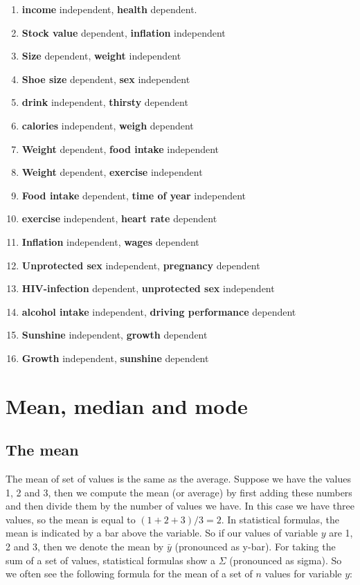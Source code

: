 \begin{enumerate}

\item \textbf{income} independent, \textbf{health} dependent.
\item \textbf{Stock value} dependent, \textbf{inflation} independent
\item \textbf{Size} dependent, \textbf{weight} independent
\item \textbf{Shoe size} dependent, \textbf{sex} independent
\item \textbf{drink} independent, \textbf{thirsty} dependent
\item \textbf{calories} independent, \textbf{weigh} dependent
\item \textbf{Weight} dependent, \textbf{food intake} independent
\item \textbf{Weight} dependent, \textbf{exercise} independent
\item \textbf{Food intake} dependent, \textbf{time of year} independent
\item \textbf{exercise} independent, \textbf{heart rate} dependent
\item \textbf{Inflation} independent, \textbf{wages} dependent
\item \textbf{Unprotected sex} independent, \textbf{pregnancy} dependent
\item \textbf{HIV-infection} dependent, \textbf{unprotected sex} independent
\item \textbf{alcohol intake} independent, \textbf{driving performance} dependent
\item \textbf{Sunshine} independent, \textbf{growth} dependent
\item \textbf{Growth} independent, \textbf{sunshine} dependent

\end{enumerate}





\section{Mean, median and mode}

\subsection{The mean}
The mean of set of values is the same as the average. Suppose we have the values 1, 2 and 3, then we compute the mean (or average) by first adding these numbers and then divide them by the number of values we have. In this case we have three values, so the mean is equal to $(1 + 2 + 3)/3 = 2$. In statistical formulas, the mean is indicated by a bar above the variable. So if our values of variable $y$ are 1, 2 and 3, then we denote the mean by $\bar{y}$ (pronounced as y-bar). For taking the sum of a set of values, statistical formulas show a $\Sigma$ (pronounced as sigma). So we often see the following formula for the mean of a set of $n$ values for variable $y$:


